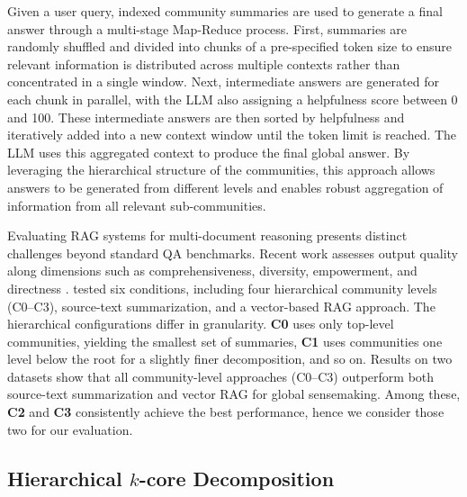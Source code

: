\documentclass[sigconf]{acmart}
\begin{document}
Given a user query, indexed community summaries are used to generate a final answer through a multi-stage Map-Reduce process. First, summaries are randomly shuffled and divided into chunks of a pre-specified token size to ensure relevant information is distributed across multiple contexts rather than concentrated in a single window. Next, intermediate answers are generated for each chunk in parallel, with the LLM also assigning a helpfulness score between 0 and 100. These intermediate answers are then sorted by helpfulness and iteratively added into a new context window until the token limit is reached. The LLM uses this aggregated context to produce the final global answer. By leveraging the hierarchical structure of the communities, this approach allows answers to be generated from different levels and enables robust aggregation of information from all relevant sub-communities.

 Evaluating RAG systems for multi-document reasoning presents distinct challenges beyond standard QA benchmarks. Recent work assesses output quality along dimensions such as comprehensiveness, diversity, empowerment, and directness \cite{edge24}. 
\citeauthor{edge24} tested six conditions, including four hierarchical community levels (C0--C3), source-text summarization, and a vector-based RAG approach. The hierarchical configurations differ in granularity. \textbf{C0} uses only top-level communities, yielding the smallest set of summaries, \textbf{C1} uses communities one level below the root for a slightly finer decomposition, and so on. Results on two datasets show that all community-level approaches (C0--C3) outperform both source-text summarization and vector RAG for global sensemaking. Among these, \textbf{C2} and \textbf{C3} consistently achieve the best performance, hence we consider those two for our evaluation.


\subsection{Hierarchical $k$-core Decomposition}
\end{document}
